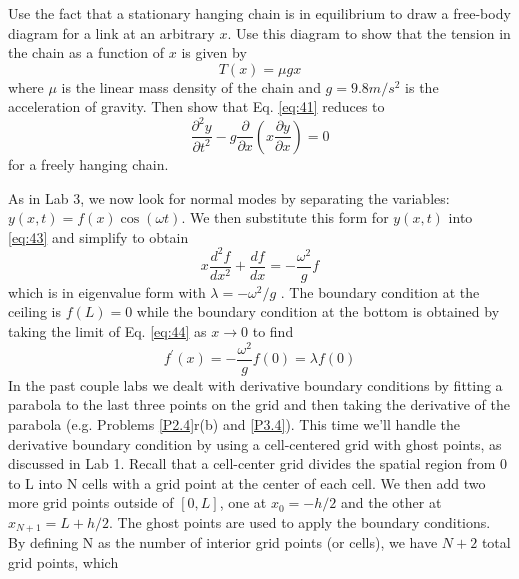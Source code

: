 \begin{problem} \label{P4.1}
Use the fact that a stationary hanging chain is in equilibrium to draw a
free-body diagram for a link at an arbitrary $x$. Use this diagram to show that
the tension in the chain as a function of $x$ is given by
	\begin{equation}\label{eq:42}
		T(x) = \mu g x
				\end{equation}		
				where $\mu$ is the linear mass density of the chain and $g = 9.8 m/s^2$
is the acceleration of gravity. Then show that Eq. \eqref{eq:41} reduces to	
	\begin{equation}\label{eq:43}
		 \frac{\partial^2 y}{\partial t^2} - g\frac{\partial}{\partial x}(x\frac{\partial y}{\partial x}) = 0
				\end{equation}	
			for a freely hanging chain. \end{problem}
			As in Lab 3, we now look for normal modes by separating the variables:
$y(x,t) = f(x)\cos(\omega t)$. We then substitute this form for $y(x,t)$ into \eqref{eq:43} and simplify to obtain	
		\begin{equation}\label{eq:44}
		 x \frac{d^2 f}{dx^2}+\frac{df}{dx} = - \frac{\omega^2}{g}f
				\end{equation}		
				which is in eigenvalue form with $ \lambda = −\omega^2/g$ . The boundary condition at the
ceiling is $f (L) = 0$ while the boundary condition at the bottom is obtained by
taking the limit of Eq. \eqref{eq:44} as $x \rightarrow 0$ to find
	\begin{equation}\label{eq:45}
		f^\prime(x) = - \frac{\omega^2}{g}f(0) = \lambda f(0)
				\end{equation}		
				In the past couple labs we dealt with derivative boundary conditions by fitting
a parabola to the last three points on the grid and then taking the derivative of
the parabola (e.g. Problems \ref{P2.4}r(b) and \ref{P3.4}). This time we\rq ll handle the derivative
boundary condition by using a cell-centered grid with ghost points, as discussed
in Lab 1. Recall that a cell-center grid divides the spatial region from 0 to L into
N cells with a grid point at the center of each cell. We then add two more grid
points outside of $[0,L]$, one at $x_0  = −h/2$ and the other at $x_{N+1} = L + h/2$. The
ghost points are used to apply the boundary conditions. By defining N as the
number of interior grid points (or cells), we have $N +2$ total grid points, which
